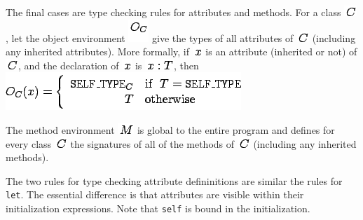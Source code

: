 \documentclass[]{article}
\begin{document}
The final cases are type checking rules for attributes and methods. For
a class \includegraphics{img61.png}, let the object environment
\includegraphics{img109.png} give the types of all attributes of
\includegraphics{img61.png} (including any inherited attributes). More
formally, if \includegraphics{img91.png} is an attribute (inherited or
not) of \includegraphics{img61.png}, and the declaration of
\includegraphics{img91.png} is \includegraphics{img110.png}, then \\

\includegraphics{img111.png}

The method environment \includegraphics{img55.png} is global to the
entire program and defines for every class \includegraphics{img61.png}
the signatures of all of the methods of \includegraphics{img61.png}
(including any inherited methods).

The two rules for type checking attribute defininitions are similar the
rules for \texttt{let}. The essential difference is that attributes are
visible within their initialization expressions. Note that \texttt{self}
is bound in the initialization. \\
\end{document}
